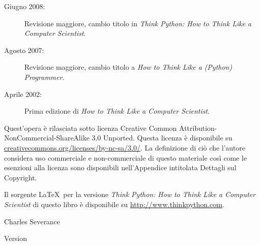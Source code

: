 \begin{latexonly}
{\begin{description}
\item[Giugno 2008:] Revisione maggiore, cambio titolo in
\emph{Think Python: How to Think Like
a Computer Scientist}.

\item[Agosto 2007:] Revisione maggiore, cambio titolo a
\emph{How to Think Like a (Python) Programmer}.

\item[Aprile 2002:] Prima edizione di  \emph{How to Think Like
a Computer Scientist}.

\end{description}

\vspace{0.2in}

Quest'opera \`{e} rilasciata sotto licenza Creative Common
Attribution-NonCommercial-ShareAlike 3.0 Unported.
Questa licenza \`{e} disponibile su
\url{creativecommons.org/licenses/by-nc-sa/3.0/}.  
La definizione di ci\`{o} che l'autore considera uso commerciale e non-commerciale di questo materiale cos\`{i} come le esenzioni alla licenza sono disponibili nell'Appendice intitolata Dettagli sul Copyright.

Il sorgente \LaTeX\ per la versione 
\emph{Think Python: How to Think Like
a Computer Scientist}
di questo libro \`{e} disponibile su
\url{http://www.thinkpython.com}.

\vspace{0.2in}

} %

\end{latexonly}



\begin{htmlonly}


{\Large \thetitle}

{\large 
Charles Severance}

Version \theversion

\setcounter{chapter}{-1}

\end{htmlonly}
